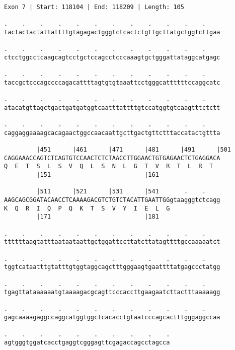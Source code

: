 \documentclass{article}
\begin{document}
\begin{Verbatim}
Exon 7 | Start: 118104 | End: 118209 | Length: 105
 
.    .    .    .    .    .    .    .    .    .    .    .    
tactactactattattttgtagagactgggtctcactctgttgcttatgctggtcttgaa
  
.    .    .    .    .    .    .    .    .    .    .    .    
ctcctggcctcaagcagtcctgctccagcctcccaaagtgctgggattataggcatgagc
  
.    .    .    .    .    .    .    .    .    .    .    .    
taccgctcccagccccagacattttagtgtgtaaattcctgggcattttttccaggcatc
  
.    .    .    .    .    .    .    .    .    .    .    .    
atacatgttagctgactgatgatggtcaatttattttgtccatggtgtcaagtttctctt
  
.    .    .    .    .    .    .    .    .    .    .    .    
caggaggaaaagcacagaactggccaacaattgcttgactgttctttaccatactgttta
  
         |451      |461      |471      |481      |491      |501
CAGGAAACCAGTCTCAGTGTCCAACTCTCTAACCTTGGAACTGTGAGAACTCTGAGGACA
Q  E  T  S  L  S  V  Q  L  S  N  L  G  T  V  R  T  L  R  T  
         |151                          |161                 
  
         |511      |521      |531      |541       .    .    
AAGCAGCGGATACAACCTCAAAAGACGTCTGTCTACATTGAATTGGgtaagggtctcagg
K  Q  R  I  Q  P  Q  K  T  S  V  Y  I  E  L  G              
         |171                          |181                 
  
.    .    .    .    .    .    .    .    .    .    .    .    
ttttttaagtatttaataataattgctggattccttatcttatagttttgccaaaaatct
  
.    .    .    .    .    .    .    .    .    .    .    .    
tggtcataatttgtatttgtggtaggcagctttgggaagtgaattttatgagccctatgg
  
.    .    .    .    .    .    .    .    .    .    .    .    
tgagttataaaaaatgtaaaagacgcagttcccaccttgaagaatcttactttaaaaagg
  
.    .    .    .    .    .    .    .    .    .    .    .    
gagcaaaagaggccaggcatggtggctcacacctgtaatcccagcactttgggaggccaa
  
.    .    .    .    .    .    .    .    .    .
agtgggtggatcacctgaggtcgggagttcgagaccagcctagcca
\end{Verbatim}
\newpage
\end{document}
